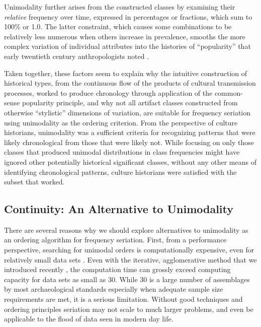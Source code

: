 Unimodality further arises from the constructed classes by examining their \emph{relative} frequency over time, expressed 
in percentages or fractions, which sum to 100\% or 1.0.  The latter constraint, which causes some combinations to be 
relatively less numerous when others increase in prevalence, smooths the more complex variation of individual attributes
into the histories of ``popularity'' that early twentieth century anthropologists noted .  

Taken together, these factors seem to explain why the intuitive
construction of historical types, from the continuous flow of the
products of cultural transmission processes, worked to produce
chronology through application of the common-sense popularity principle,
and why not all artifact classes constructed from otherwise
``stylistic'' dimensions of variation, are suitable for frequency
seriation using unimodality as the ordering criterion. From the
perspective of culture historians, unimodality was a sufficient criteria
for recognizing patterns that were likely chronological from those that
were likely not. While focusing on only those classes that produced
unimodal distributions in class frequencies might have ignored other
potentially historical significant classes, without any other means of
identifying chronological patterns, culture historians were satisfied
with the subset that worked.

\subsection{Continuity: An Alternative to
Unimodality}\label{multser:sec:continuity-an-alternative-to-unimodality}

There are several reasons why we should explore alternatives to
unimodality as an ordering algorithm for frequency seriation. First,
from a performance perspective, searching for unimodal orders is
computationally expensive, even for relatively small data sets
\citep{Madsen2014}. Even with the iterative, agglomerative method that
we introduced recently \citep{Lipo2015}, the computation
time can grossly exceed computing capacity for data sets as small as 30.
While 30 is a large number of assemblages by most archaeological
standards especially when adequate sample size requirements are met, it
is a serious limitation. Without good techniques and ordering principles
seriation may not scale to much larger problems, and even be applicable
to the flood of data seen in modern day life.

